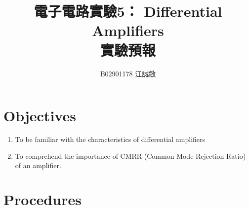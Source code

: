 \documentclass[12pt, a4paper]{article}
\title{ \bf {\huge 電子電路實驗5： Differential Amplifiers }\\ 實驗預報}
\author{B02901178 江誠敏}
\begin{document}
\maketitle

\section{Objectives}
\begin{enumerate}
  \item  To be familiar with the characteristics of differential amplifiers
  \item  To comprehend the importance of CMRR (Common Mode Rejection Ratio)
of an amplifier.  
\end{enumerate}


\section{Procedures}
\end{document}
